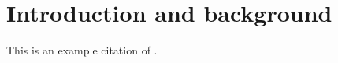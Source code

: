 \chapter{Introduction and background}

This is an example citation of \clkscrew \parencite{clkscrew}.









